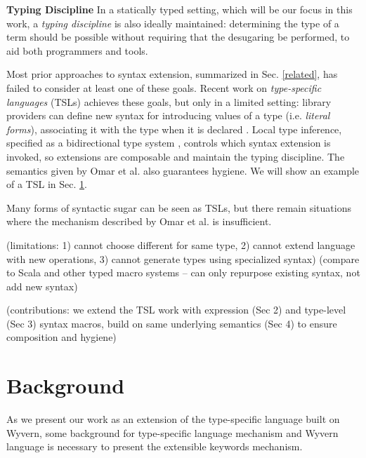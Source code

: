 \documentclass{sig-alternate}
\begin{document}
\noindent
\textbf{Typing Discipline} In a statically typed setting, which will be our focus in this work, a \emph{typing discipline} is also ideally maintained: determining the type of a term should be possible without requiring that the desugaring be performed, to aid both programmers and tools. 

Most prior approaches to syntax extension, summarized in Sec. \ref{related}, has failed to consider at least one of these goals. Recent work on \emph{type-specific languages} (TSLs) achieves these goals, but only in a limited setting: library providers can define new syntax for introducing values of a type (i.e. \emph{literal forms}), associating it with the type when it is declared \cite{TSLs}. Local type inference, specified as a bidirectional type system \cite{Pierce:2000:LTI:345099.345100}, controls which syntax extension is invoked, so extensions are composable and maintain the typing discipline. The semantics given by Omar et al. also guarantees hygiene. We will show an example of a TSL in Sec. \ref{background}.

Many forms of syntactic sugar can be seen as TSLs, but there remain situations where the mechanism described by Omar et al. is insufficient. 

(limitations: 1) cannot choose different for same type, 2) cannot extend language with new operations, 3) cannot generate types using specialized syntax) (compare to Scala and other typed macro systems -- can only repurpose existing syntax, not add new syntax)

(contributions: we extend the TSL work with expression (Sec 2) and type-level (Sec 3) syntax macros, build on same underlying semantics (Sec 4) to ensure composition and hygiene)

\section{Background}\label{background}
As we present our work as an extension of the type-specific language built on Wyvern, some background for type-specific language mechanism and Wyvern language is necessary to present the extensible keywords mechanism. 
\end{document}
